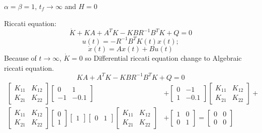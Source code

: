 $\alpha = \beta = 1$, $t_f\to \infty $ and $H = 0$



Riccati equation:
\begin{equation}\label{riccati_equation}
	\dot{K} + KA +A^TK - KBR^{-1}B^TK + Q = 0
\end{equation}
\begin{equation}\label{uQ3_a}
	u(t)	= -R^{-1}B^TK(t)x(t);
\end{equation}
\begin{equation}\label{xQ3_a}
	\dot x(t) = Ax(t) + Bu(t)
\end{equation}
Because of $t \to \infty$, $\dot K = 0$ so Differential riccati equation change to Algebraic riccati equation.  
\begin{equation}\label{Al_riccati_equation}
	KA +A^TK - KBR^{-1}B^TK + Q = 0
\end{equation}
\begin{align*}
 \begin{bmatrix}
		K_{11} & K_{12} \\
		K_{21} & K_{22}
	\end{bmatrix} 
	\begin{bmatrix}
		0 & 1 \\
		-1 & -0.1
	\end{bmatrix} &+
	\begin{bmatrix}
		0 & -1 \\
		1 & -0.1
	\end{bmatrix} 
	\begin{bmatrix}
		K_{11} & K_{12} \\
		K_{21} & K_{22}
	\end{bmatrix} + \\
 \begin{bmatrix}
	K_{11} & K_{12} \\
	K_{21} & K_{22}
\end{bmatrix}  \begin{bmatrix}
0 \\
1
\end{bmatrix}
 \begin{bmatrix}
	1
\end{bmatrix}
 \begin{bmatrix}
 0 & 1
\end{bmatrix}   
 \begin{bmatrix}
	K_{11} & K_{12} \\
	K_{21} & K_{22}
\end{bmatrix} &+  \begin{bmatrix}
1 & 0 \\
0 & 1
\end{bmatrix}  =  \begin{bmatrix}
0 & 0 \\
0 & 0
\end{bmatrix} 
\end{align*}
